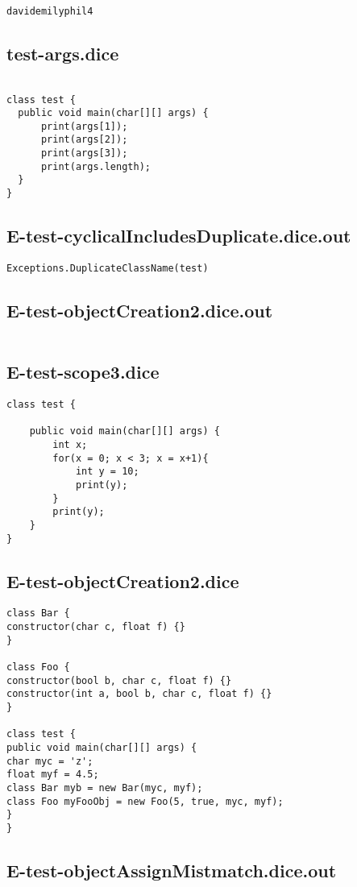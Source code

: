 \begin{verbatim}
davidemilyphil4
\end{verbatim}\pagebreak\subsection{test-args.dice}
\begin{verbatim}

class test {
  public void main(char[][] args) {
      print(args[1]);
      print(args[2]);
      print(args[3]);
      print(args.length);
  }
}
\end{verbatim}\pagebreak\subsection{E-test-cyclicalIncludesDuplicate.dice.out}
\begin{verbatim}
Exceptions.DuplicateClassName(test)

\end{verbatim}\pagebreak\subsection{E-test-objectCreation2.dice.out}
\begin{verbatim}

\end{verbatim}\pagebreak\subsection{E-test-scope3.dice}
\begin{verbatim}
class test {

	public void main(char[][] args) {
		int x;
		for(x = 0; x < 3; x = x+1){
			int y = 10;
			print(y);
		}
		print(y);
	}
}
\end{verbatim}\pagebreak\subsection{E-test-objectCreation2.dice}
\begin{verbatim}
class Bar {
constructor(char c, float f) {}
}

class Foo {
constructor(bool b, char c, float f) {}
constructor(int a, bool b, char c, float f) {}
}

class test {
public void main(char[][] args) {
char myc = 'z';
float myf = 4.5;
class Bar myb = new Bar(myc, myf);
class Foo myFooObj = new Foo(5, true, myc, myf);
}
}
\end{verbatim}\pagebreak\subsection{E-test-objectAssignMistmatch.dice.out}
